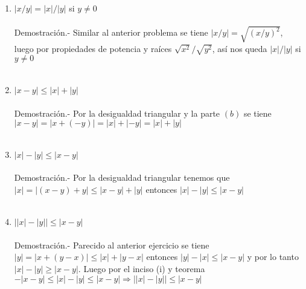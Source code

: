 \begin{enumerate}[ \bfseries 1.]
\begin{enumerate}[\bfseries (a)]
\item $|x/y|=|x|/|y|$ si $y \neq 0$\\\\
Demostración.- \; Similar al anterior problema se tiene $|x/y|=\sqrt{(x/y)^2}$, luego por propiedades de  potencia y raíces $\sqrt{x^2}/\sqrt{y^2}$, así nos queda $|x|/|y|$ si $y \neq 0$\\\\

\item $|x-y|\leq |x|+|y|$\\\\
Demostración.- \; Por la desigualdad triangular y la parte $(b)$ se tiene $|x-y| = |x+(-y)| = |x|+ |-y| = |x|+|y|$\\\\

\item $|x|-|y| \leq |x-y|$\\\\
Demostración.- \; Por la desigualdad triangular tenemos  que $|x|= |(x-y)+y| \leq |x-y|+|y|$ entonces $|x|-|y| \leq |x-y|$\\\\

\item $\left| |x| - |y| \right| \leq |x-y|$\\\\
Demostración.- \; Parecido al anterior ejercicio se tiene $|y|=|x+(y-x)| \leq |x|+|y-x|$ entonces $|y|-|x| \leq |x-y|$ y por lo tanto $|x|-|y|\geq |x-y|$. Luego por el inciso (i) y teorema $-|x-y|\leq |x|-|y| \leq |x-y| \Rightarrow \left||x|-|y|\right| \leq |x-y|$\\\\ 

\end{enumerate}


\end{enumerate}
